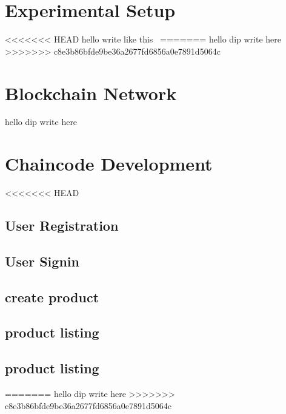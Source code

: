 \section{ Experimental Setup}
<<<<<<< HEAD
\noindent hello write like this 
\
=======
\noindent hello dip write here 
>>>>>>> c8e3b86bfde9be36a2677fd6856a0e7891d5064c

\section{Blockchain Network}
\noindent hello dip write here 

\section{Chaincode Development}
<<<<<<< HEAD
\lipsum[22-25]
\subsection{User Registration}

\subsection{User Signin}

\subsection{create product}

\subsection{product listing}

\subsection{product listing}

=======
\noindent hello dip write here 
>>>>>>> c8e3b86bfde9be36a2677fd6856a0e7891d5064c







